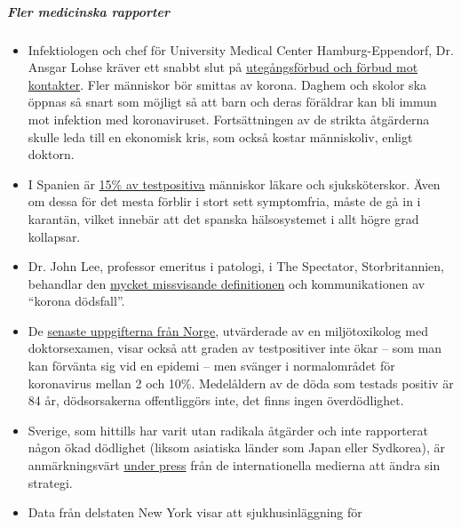\hypertarget{fler-medicinska-rapporter}{%
\subparagraph{\texorpdfstring{\textbf{Fler medicinska
rapporter}}{Fler medicinska rapporter}}\label{fler-medicinska-rapporter}}

\begin{itemize}
\tightlist
\item
  Infektiologen och chef för University Medical Center
  Hamburg-Eppendorf, Dr. Ansgar Lohse kräver ett snabbt slut på
  \href{https://www.mopo.de/hamburg/uke-infektiologe-fordert-es-muessen-sich-mehr-menschen-mit-corona-infizieren-36483636}{utegångsförbud
  och förbud mot kontakter}. Fler människor bör smittas av korona.
  Daghem och skolor ska öppnas så snart som möjligt så att barn och
  deras föräldrar kan bli immun mot infektion med koronaviruset.
  Fortsättningen av de strikta åtgärderna skulle leda till en ekonomisk
  kris, som också kostar människoliv, enligt doktorn.
\item
  I Spanien är
  \href{https://www.heise.de/tp/features/Das-ist-keine-Krise-sondern-eine-Katastrophe-4694104.html}{15\%
  av testpositiva} människor läkare och sjuksköterskor. Även om dessa
  för det mesta förblir i stort sett symptomfria, måste de gå in i
  karantän, vilket innebär att det spanska hälsosystemet i allt högre
  grad kollapsar.
\item
  Dr. John Lee, professor emeritus i patologi, i The Spectator,
  Storbritannien, behandlar den
  \href{https://www.spectator.co.uk/article/how-to-understand-and-report-figures-for-covid-19-deaths-}{mycket
  missvisande definitionen} och kommunikationen av ``korona dödsfall''.
\item
  De
  \href{https://swprs.files.wordpress.com/2020/04/die-lage-in-norwegen.pdf}{senaste
  uppgifterna från Norge}, utvärderade av en miljötoxikolog med
  doktorsexamen, visar också att graden av testpositiver inte ökar --
  som man kan förvänta sig vid en epidemi -- men svänger i normalområdet
  för koronavirus mellan 2 och 10\%. Medelåldern av de döda som testads
  positiv är 84 år, dödsorsakerna offentliggörs inte, det finns ingen
  överdödlighet.
\item
  Sverige, som hittills har varit utan radikala åtgärder och inte
  rapporterat någon ökad dödlighet (liksom asiatiska länder som Japan
  eller Sydkorea), är anmärkningsvärt
  \href{https://www.theguardian.com/world/2020/mar/30/catastrophe-sweden-coronavirus-stoicism-lockdown-europe}{under
  press} från de internationella medierna att ändra sin strategi.
\item
  Data från delstaten New York visar att sjukhusinläggning för

\end{itemize}
